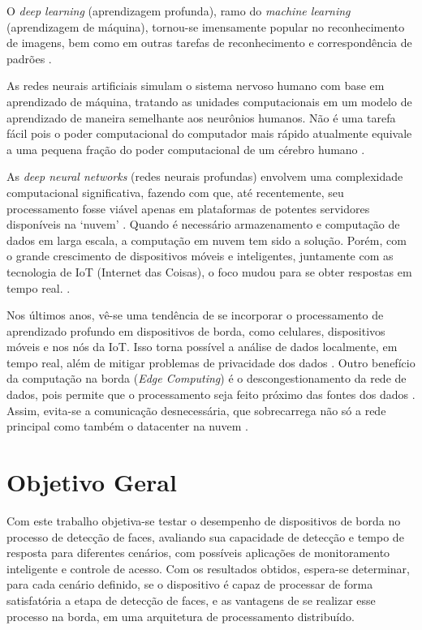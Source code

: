 O \textit{deep learning} (aprendizagem profunda), ramo do \textit{machine learning} (aprendizagem de máquina), tornou-se imensamente popular no reconhecimento de imagens, bem como em outras tarefas de reconhecimento e correspondência de padrões \cite{Verhelst2017}.

As redes neurais artificiais simulam o sistema nervoso humano com base em aprendizado de máquina, tratando as unidades computacionais em um modelo de aprendizado de maneira semelhante aos neurônios humanos. Não é uma tarefa fácil pois o poder computacional do computador mais rápido atualmente equivale a uma pequena fração do poder computacional de um cérebro humano \cite{Aggarwal2018}.

As \textit{deep neural networks} (redes neurais profundas) envolvem uma complexidade computacional significativa, fazendo com que, até recentemente, seu processamento fosse viável apenas em plataformas de potentes servidores disponíveis na ‘nuvem’ \cite{Verhelst2017}. Quando é necessário armazenamento e computação de dados em larga escala, a computação em nuvem tem sido a solução. Porém, com o grande crescimento de dispositivos móveis e inteligentes, juntamente com as tecnologia de IoT (Internet das Coisas), o foco mudou para se obter respostas em tempo real. \cite{Dolui2017}.

Nos últimos anos, vê-se uma tendência de se incorporar o processamento de aprendizado profundo em dispositivos de borda, como celulares, dispositivos móveis e nos nós da IoT. Isso torna possível a análise de dados localmente, em tempo real, além de mitigar problemas de privacidade dos dados \cite{Verhelst2017}. Outro benefício da computação na borda (\textit{Edge Computing}) é o descongestionamento da rede de dados, pois permite que o processamento seja feito próximo das fontes dos dados \cite{Merenda2020}. Assim, evita-se a comunicação desnecessária, que sobrecarrega não só a rede principal como também o datacenter na nuvem \cite{Aazam2014}.

\section{Objetivo Geral}

Com este trabalho objetiva-se testar o desempenho de dispositivos de borda no processo de detecção de faces, avaliando sua capacidade de detecção e tempo de resposta para diferentes cenários, com possíveis aplicações de monitoramento inteligente e controle de acesso. Com os resultados obtidos, espera-se determinar, para cada cenário definido, se o dispositivo é capaz de processar de forma satisfatória a etapa de detecção de faces, e as vantagens de se realizar esse processo na borda, em uma arquitetura de processamento distribuído.

